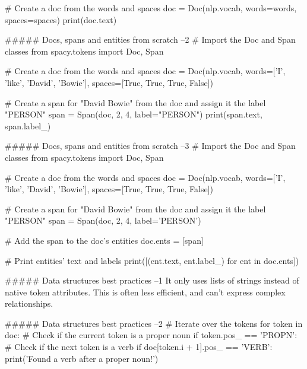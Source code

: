 # Create a doc from the words and spaces
doc = Doc(nlp.vocab, words=words, spaces=spaces)
print(doc.text)



##### Docs, spans and entities from scratch  --2
# Import the Doc and Span classes
from spacy.tokens import Doc, Span

# Create a doc from the words and spaces
doc = Doc(nlp.vocab, words=['I', 'like', 'David', 'Bowie'], spaces=[True, True, True, False])

# Create a span for "David Bowie" from the doc and assign it the label "PERSON"
span = Span(doc, 2, 4, label="PERSON")
print(span.text, span.label_)



##### Docs, spans and entities from scratch  --3
# Import the Doc and Span classes
from spacy.tokens import Doc, Span

# Create a doc from the words and spaces
doc = Doc(nlp.vocab, words=['I', 'like', 'David', 'Bowie'], spaces=[True, True, True, False])

# Create a span for "David Bowie" from the doc and assign it the label "PERSON"
span = Span(doc, 2, 4, label='PERSON')

# Add the span to the doc's entities
doc.ents = [span]

# Print entities' text and labels
print([(ent.text, ent.label_) for ent in doc.ents])



##### Data structures best practices  --1
It only uses lists of strings instead of native token attributes. This is often less efficient, and can't express complex relationships.

##### Data structures best practices  --2
# Iterate over the tokens
for token in doc:
    # Check if the current token is a proper noun
    if token.pos_ == 'PROPN':
        # Check if the next token is a verb
        if doc[token.i + 1].pos_ == 'VERB':
            print('Found a verb after a proper noun!')



